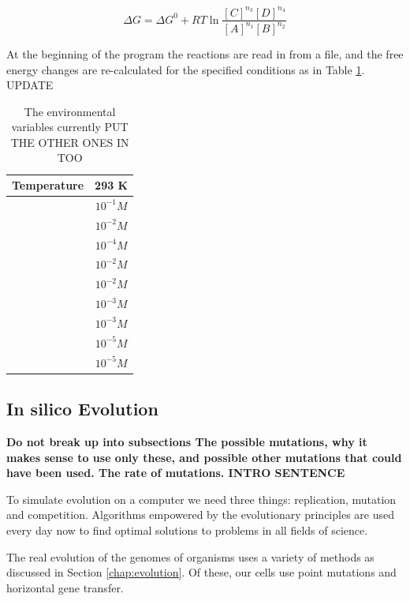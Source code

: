 \documentclass[10pt,a4paper]{article}
\begin{document}
	\begin{equation}\label{eq:freeechange}
		\Delta G = \Delta G^0 + R T \ln \frac{[C]^{n_3}[D]^{n_4}}{[A]^{n_1}[B]^{n_2}}
	\end{equation}
	
	At the beginning of the program the reactions are read in from a file, and the free energy changes are re-calculated for the specified conditions as in Table \ref{environmentTable}. UPDATE
	
	\begin{table}
		\centering
	\begin{tabular}{|c|c|}
		
		\hline Temperature & 293 K \\ 
		\hline [ATP] & $10^{-1} M$ \\ 
		\hline [ADP] & $10^{-2} M$ \\ 
		\hline [AMP] & $10^{-4} M$ \\ 
		\hline [NAD] & $10^{-2} M$ \\ 
		\hline [NADH] & $10^{-2} M$ \\ 
		\hline [Pi] &  $10^{-3} M$\\ 
		\hline [PPi] & $10^{-3} M$ \\ 
		\hline [CO$_2$] & $10^{-5} M$ \\ 
		\hline [NH$_3$] & $10^{-5} M$ \\ 

		\hline 
	\end{tabular} 
	\caption{The environmental variables currently PUT THE OTHER ONES IN TOO}
	\label{environmentTable}
	\end{table}





\subsection{In silico Evolution}
\label{sub:Implementing evolution}
\textbf{
Do not break up into subsections
The possible mutations, why it makes sense to use only these, and possible other mutations that could have been used. The rate of mutations. 
INTRO SENTENCE}

To simulate evolution on a computer we need three things: replication, mutation and competition. Algorithms empowered by the evolutionary principles \cite{evolutionaryalgorithms} are used every day now to find optimal solutions to problems in all fields of science.


	The real evolution of the genomes of organisms uses a variety of methods as discussed in Section \ref{chap:evolution}. Of these, our cells use point mutations and horizontal gene transfer.
	
\end{document}
